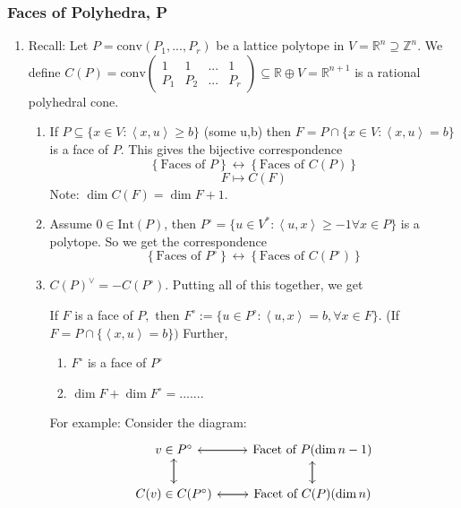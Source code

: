 \documentclass[a4paper,12pt]{amsart}
\newcommand{\R}{\ensuremath{\mathbb{R}}}
\newcommand{\Z}{\ensuremath{\mathbb{Z}}}
\newcommand{\Mat}[1]{\begin{pmatrix}#1\end{pmatrix}}
\newcommand{\ip}[1]{\left \langle #1 \right \rangle}
\begin{document}
\subsubsection*{Faces of Polyhedra, P}
\begin{enumerate}
	\item Recall: Let $P=\text{conv}(P_1,...,P_r)$ be a lattice polytope in $V=\R^n\supseteq\Z^n.$ We define $C(P)=\text{conv}\Mat{1 & 1 & ... &1\\ P_1& P_2& ... &P_r}\subseteq \R\oplus V=\R^{n+1}$ is a rational polyhedral cone. 
	\begin{enumerate}
			\item If $P\subseteq\{x\in V:\ip{x,u}\geq b   \}$ (some u,b) then $F=P\cap \{x\in V:\ip{x,u}= b   \}$ is a face of $P.$ This gives the bijective correspondence \[ \left\{ \text{Faces of }P  \right\} \leftrightarrow \left\{ \text{Faces of }C(P)  \right\} \]
		\[ F\mapsto C(F)\]
		Note: $\dim C(F)=\dim F+1.$ 
		\item Assume $0\in \text{Int}(P)$, then $P^\circ =\{ u\in V^*: \ip{u,x}\geq -1 \forall x\in P   \}$ is a polytope. So we get the correspondence 
		 \[ \left\{ \text{Faces of }P^\circ  \right\} \leftrightarrow \left\{ \text{Faces of }C(P^\circ)  \right\} \]
		 \item $C(P)^\vee=-C(P^\circ).$ Putting all of this together, we get 
		 \begin{remark}
		 	If $F$ is a face of $P,$ then $F^\circ := \{u\in P^\circ:\ip{u,x}=b, \forall x\in F   \}.$ (If $F=P\cap \{\ip{x,u}=b  \})$ Further, \begin{enumerate}
		 		\item $F^\circ$ is a face of $P^\circ$ 
		 		\item $\dim F+\dim F^\circ=.......$
		 	\end{enumerate}
	 	For example: Consider the diagram: \[ \begin{tikzcd}
	 	v\in P^\circ \arrow[d] \arrow[r]& \text{Facet of }P (\dim n-1)\arrow[l] \arrow [d]\\
	 	C(v)\in C(P^\circ)\arrow[u] \arrow[r] & \text{Facet of } C(P)(\dim n) \arrow[l] \arrow[u]
	 	\end{tikzcd} \] 
		 \end{remark}
	 
		
	\end{enumerate}

\end{enumerate}
\end{document}
